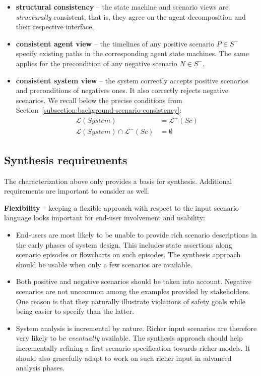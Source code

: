 \begin{itemize}
\item \textbf{structural consistency} -- the state machine and scenario views are \emph{structurally} consistent, that is, they agree on the agent decomposition and their respective interface,
\item \textbf{consistent agent view} -- the timelines of any positive scenario $P \in S^+$ specify existing paths in the corresponding agent state machines. The same applies for the precondition of any negative scenario $N \in S^-$.
\item \textbf{consistent system view} -- the system correctly accepts positive scenarios and preconditions of negatives ones. It also correctly rejects negative scenarios. We recall below the precise conditions from Section~\ref{subsection:background-scenario-consistency}:
\begin{align*}
\mathcal{L}(System) &= \mathcal{L}^+(Sc)\\
\mathcal{L}(System) \cap \mathcal{L}^-(Sc) &= \emptyset
\end{align*}

\end{itemize}


\subsection{Synthesis requirements\label{subsection:inductive-synthesis-requirements}}

The characterization above only provides a basis for synthesis. Additional requirements are important to consider as well. 

\noindent \textbf{Flexibility} -- keeping a flexible approach with respect to the input scenario language looks important for end-user involvement and usability:
\begin{itemize}

\item End-users are most likely to be unable to provide rich scenario descriptions in the early phases of system design. This includes state assertions along scenario episodes or flowcharts on such episodes. The synthesis approach should be usable when only a few scenarios are available.

\item Both positive and negative scenarios should be taken into account. Negative scenarios are not uncommon among the examples provided by stakeholders. One reason is that they naturally illustrate violations of safety goals while being easier to specify than the latter. 

\item System analysis is incremental by nature. Richer input scenarios are therefore very likely to be \emph{eventually} available. The synthesis approach should help incrementally refining a first scenario specification towards richer models. It should also gracefully adapt to work on such richer input in advanced analysis phases.

\end{itemize}

